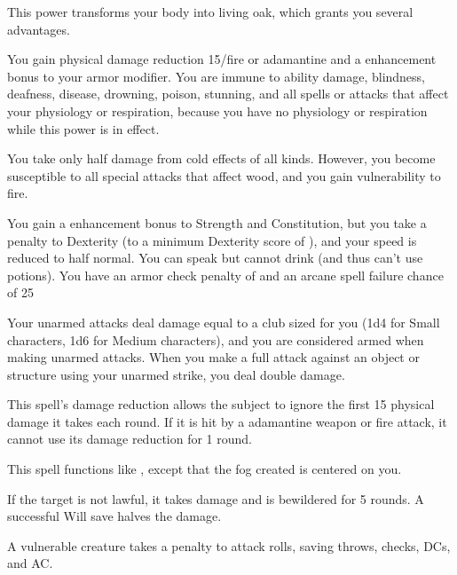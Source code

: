 \begin{spelleffect}
  This power transforms your body into living oak, which grants you several advantages.
  \par You gain physical damage reduction 15/fire or adamantine and a  enhancement bonus to your armor modifier. You are immune to ability damage, blindness, deafness, disease, drowning, poison, stunning, and all spells or attacks that affect your physiology or respiration, because you have no physiology or respiration while this power is in effect.
  \par You take only half damage from cold effects of all kinds. However, you become susceptible to all special attacks that affect wood, and you gain vulnerability to fire.
  \par You gain a  enhancement bonus to Strength and Constitution, but you take a  penalty to Dexterity (to a minimum Dexterity score of ), and your speed is reduced to half normal. You can speak but cannot drink (and thus can't use potions). You have an armor check penalty of  and an arcane spell failure chance of 25%
  \par Your unarmed attacks deal damage equal to a club sized for you (1d4 for Small characters, 1d6 for Medium characters), and you are considered armed when making unarmed attacks. When you make a full attack against an object or structure using your unarmed strike, you deal double damage.
\end{spelleffect}
\begin{spellnotes}
  This spell's damage reduction allows the subject to ignore the first 15 physical damage it takes each round. If it is hit by a adamantine weapon or fire attack, it cannot use its damage reduction for 1 round.
\end{spellnotes}

\begin{spelleffect}
  This spell functions like , except that the fog created is centered on you.
\end{spelleffect}

\spellrng{\rngmed}
\begin{spelleffect}
  If the target is not lawful, it takes damage and is bewildered for 5 rounds. A successful Will save halves the damage.
\end{spelleffect}
\begin{spellnotes}
  A vulnerable creature takes a  penalty to attack rolls, saving throws, checks, DCs, and AC.
\end{spellnotes}

